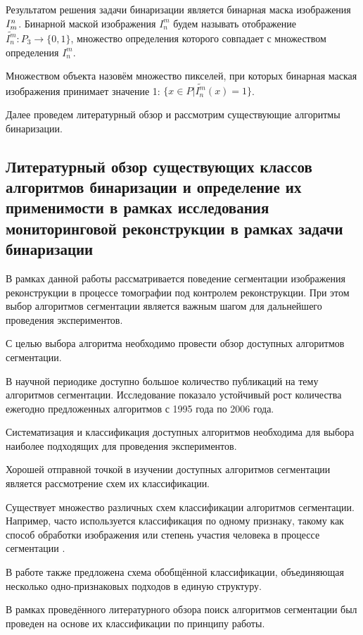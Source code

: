 Результатом решения задачи бинаризации является бинарная маска изображения \(I^n_m\).
Бинарной маской изображения \(I_n^m\) будем называть отображение \(\tilde{I_n^m} : P_3 \rightarrow \{0, 1\}\), множество определения которого совпадает с множеством определения \(I_n^m\).

Множеством объекта назовём множество пикселей, при которых бинарная маская изображения принимает значение 1: \(\{x \in P | \tilde{I_n^m}(x) = 1 \}\).

Далее проведем литературный обзор и рассмотрим существующие алгоритмы бинаризации.



\subsection{Литературный обзор существующих классов алгоритмов бинаризации и определение их применимости в рамках исследования мониторинговой реконструкции в рамках задачи бинаризации}

В рамках данной работы рассматривается поведение сегментации изображения реконструкции в процессе томографии под контролем реконструкции. При этом выбор алгоритмов сегментации является важным шагом для дальнейшего проведения экспериментов.

С целью выбора алгоритма необходимо провести обзор доступных алгоритмов сегментации.

В научной периодике доступно большое количество публикаций на тему алгоритмов сегментации. Исследование \cite{zhang2006advances} показало устойчивый рост количества ежегодно предложенных алгоритмов с 1995 года по 2006 года.

Систематизация и классификация доступных алгоритмов необходима для выбора наиболее подходящих для проведения экспериментов. 

Хорошей отправной точкой в изучении доступных алгоритмов сегментации является рассмотрение схем их классификации. 

Существует множество различных схем классификации алгоритмов сегментации. Например, часто используется классификация по одному признаку, такому как способ обработки изображения или степень участия человека в процессе сегментации \cite{wirjadi2007survey}.

В работе \cite{ханыков2018классификация} также предложена схема обобщённой классификации, объединяющая несколько одно-признаковых подходов в единую структуру.

В рамках проведённого литературного обзора поиск алгоритмов сегментации был проведен на основе их классификации по принципу работы.

